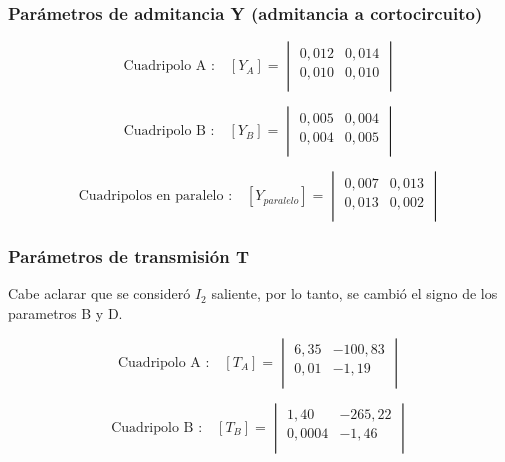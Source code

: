 \documentclass[a4paper]{article}
\begin{document}
\subsubsection*{Parámetros de admitancia Y (admitancia a cortocircuito)}

\begin{equation}
\text{Cuadripolo A :}\quad [Y_{A}] =
\begin{vmatrix}
	0,012 & 0,014\\
	0,010 & 0,010\\
\end{vmatrix}
\end{equation}

\begin{equation}
\text{Cuadripolo B :}\quad [Y_{B}] =
\begin{vmatrix}
	0,005 & 0,004\\
	0,004 & 0,005\\
\end{vmatrix}
\end{equation}

\begin{equation}
\text{Cuadripolos en paralelo :}\quad [Y_{paralelo}] =
\begin{vmatrix}
	0,007 & 0,013\\
	0,013 & 0,002\\
\end{vmatrix}
\end{equation}

\subsubsection*{Parámetros de transmisión T}

Cabe aclarar que se consideró $I_2$ saliente, por lo tanto, se cambió el signo de los parametros B y D.

\begin{equation}
\text{Cuadripolo A :}\quad [T_{A}] =
\begin{vmatrix}
	6,35 & -100,83\\
	0,01 & -1,19\\
\end{vmatrix}
\end{equation}

\begin{equation}
\text{Cuadripolo B :}\quad [T_{B}] =
\begin{vmatrix}
	1,40 & -265,22\\
	0,0004 & -1,46\\
\end{vmatrix}
\end{equation}
\end{document}
